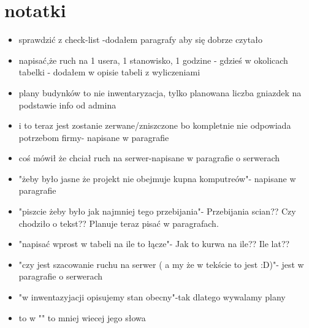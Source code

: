 \documentclass{report}
\begin{document}


\chapter*{notatki}

\begin{itemize}

\item sprawdzić z check-list -dodałem paragrafy aby się dobrze czytało
\item napisać,że ruch na 1 usera, 1 stanowisko, 1 godzine - gdzieś w okolicach tabelki - dodałem w opisie tabeli z wyliczeniami
\item plany budynków to nie inwentaryzacja, tylko planowana liczba gniazdek na podstawie info od admina
\item i to teraz jest zostanie zerwane/zniszczone bo kompletnie nie odpowiada potrzebom firmy- napisane w paragrafie
\item coś mówił że chciał ruch na serwer-napisane w paragrafie o serwerach 
\item "żeby było jasne że projekt nie obejmuje kupna komputreów"- napisane w paragrafie
\item "piszcie żeby było jak najmniej tego przebijania"- Przebijania scian?? Czy chodziło o tekst?? Planuje teraz pisać w paragrafach.
\item "napisać wprost w tabeli na ile to łącze"- Jak to kurwa na ile?? Ile lat??
\item "czy jest szacowanie ruchu na serwer ( a my że w tekście to jest :D)"- jest w paragrafie o serwerach 
\item "w inwentazyjacji opisujemy stan obecny"-tak dlatego wywalamy plany
\item to w "" to mniej wiecej jego słowa


 
\end{itemize}
\end{document}
